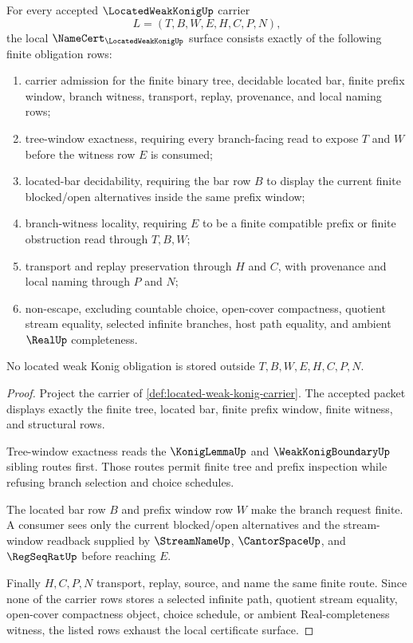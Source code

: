 \begin{theorem}
\label{thm:located-weak-konig-namecert-obligations}
For every accepted $\LocatedWeakKonigUp$ carrier
$$
L=(T,B,W,E,H,C,P,N),
$$
the local $\NameCert_{\LocatedWeakKonigUp}$ surface consists exactly of the following finite obligation rows:
\begin{enumerate}
\item carrier admission for the finite binary tree, decidable located bar, finite prefix window, branch witness, transport, replay, provenance, and local naming rows;
\item tree-window exactness, requiring every branch-facing read to expose $T$ and $W$ before the witness row $E$ is consumed;
\item located-bar decidability, requiring the bar row $B$ to display the current finite blocked/open alternatives inside the same prefix window;
\item branch-witness locality, requiring $E$ to be a finite compatible prefix or finite obstruction read through $T,B,W$;
\item transport and replay preservation through $H$ and $C$, with provenance and local naming through $P$ and $N$;
\item non-escape, excluding countable choice, open-cover compactness, quotient stream equality, selected infinite branches, host path equality, and ambient $\RealUp$ completeness.
\end{enumerate}
No located weak Konig obligation is stored outside $T,B,W,E,H,C,P,N$.
\end{theorem}
\begin{proof}
Project the carrier of \autoref{def:located-weak-konig-carrier}. The accepted packet displays exactly the finite tree, located bar, finite prefix window, finite witness, and structural rows.

Tree-window exactness reads the $\KonigLemmaUp$ and $\WeakKonigBoundaryUp$ sibling routes first. Those routes permit finite tree and prefix inspection while refusing branch selection and choice schedules.

The located bar row $B$ and prefix window row $W$ make the branch request finite. A consumer sees only the current blocked/open alternatives and the stream-window readback supplied by $\StreamNameUp$, $\CantorSpaceUp$, and $\RegSeqRatUp$ before reaching $E$.

Finally $H,C,P,N$ transport, replay, source, and name the same finite route. Since none of the carrier rows stores a selected infinite path, quotient stream equality, open-cover compactness object, choice schedule, or ambient Real-completeness witness, the listed rows exhaust the local certificate surface.
\end{proof}

